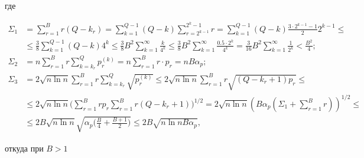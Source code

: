 где


\begin{align*}


\Sigma _{1}&=\sum _{r=1}^{B}r ( Q-k_{r})=


\sum _{k=1}^{Q-1}(Q-k) \sum _{r=2^{k-1}}^{2^{k}-1}r=


\sum _{k=1}^{Q-1}(Q-k) \frac {3\cdot 2^{k-1}-1}{2} 2^{k-1} \le \\


%


&\le


\frac {3}{8} \sum _{k=1}^{Q-1}(Q-k) 4^{k} \le


\frac {3}{8} B^{2} \sum _{k=1}^{\infty } \frac {k}{4^{k}} \le


\frac {3}{8} B^{2} \sum _{k=1}^{\infty }


\frac {0.5 \cdot 2^{k}}{4^{k}} =


\frac {3}{16} B^{2} \sum _{k=1}^{\infty } \frac {1}{2^{k}} <


\frac {B^{2}}{4}; \\


%


\Sigma _{2}&= n\sum _{r=1}^{B}r \sum _{k=k_{r}}^{Q} p_{r}^{(k)} =


n\sum _{r=1}^{B}r \cdot p_{r} = nB \alpha _{p}; \\


%


\Sigma _{3}&= 2 \sqrt {n \ln n} \sum _{r=1}^{B}r


\sum _{k=k_{r}}^{Q} \sqrt {p_{r}^{(k)}} \le


2 \sqrt {n \ln n} \sum _{r=1}^{B}r \sqrt{ (Q-k_{r}+1)p_{r}} \le \\


%


&\le 2 \sqrt {n \ln n}


\biggl(\sum _{r=1}^{B}r p_{r}\sum _{r=1}^{B}r(Q-k_{r}+1)\biggr) ^{1/2} =


2 \sqrt {n \ln n}


(B \alpha _{p} ( \Sigma_{1} + \sum _{r=1}^{B}r)) ^{1/2} \le \\


%


&\le 2B\sqrt {n \ln n} \sqrt {\alpha _{p}


\biggl( \frac {B}{4} + \frac {B+1}{2} \biggr) } \le


2B\sqrt {n \ln nB\alpha _{p}},


\end{align*}


откуда при $B>1$



